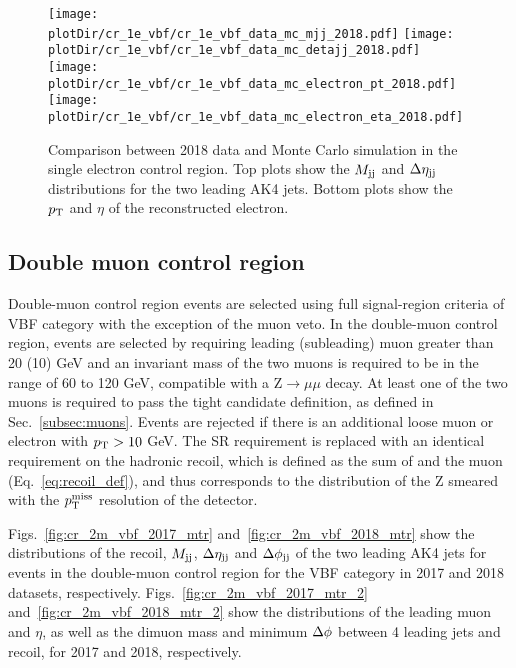 \begin{figure}[htbp]
    \begin{center}
        \texttt{[image: \\plotDir/cr\_1e\_vbf/cr\_1e\_vbf\_data\_mc\_mjj\_2018.pdf]}
        \texttt{[image: \\plotDir/cr\_1e\_vbf/cr\_1e\_vbf\_data\_mc\_detajj\_2018.pdf]} \\
        \texttt{[image: \\plotDir/cr\_1e\_vbf/cr\_1e\_vbf\_data\_mc\_electron\_pt\_2018.pdf]}
        \texttt{[image: \\plotDir/cr\_1e\_vbf/cr\_1e\_vbf\_data\_mc\_electron\_eta\_2018.pdf]}
    \end{center}
    \caption{Comparison between 2018 data and Monte Carlo simulation in the single electron control region. Top plots
    show the $M_{\textrm{jj}}$ and $\Delta \eta_{\textrm{jj}}$ distributions for the two leading AK4 jets. Bottom plots show the $p_{\textrm{T}}$ and $\eta$
    of the reconstructed electron.}
    \label{fig:cr_1e_vbf_2018_mtr}
\end{figure}

\clearpage

\subsection{Double muon control region}
\label{sec:selection_cr_2m}

Double-muon control region events are selected using full signal-region criteria of VBF category with the exception of the muon veto. 
In the double-muon control region, events are selected by requiring leading (subleading) muon \pt greater than 20 (10) GeV and 
an invariant mass of the two muons is required to be in the range of 60 to 120 GeV, compatible with a $\textrm{Z} \rightarrow \mu \mu$ decay. 
At least one of the two muons is required to 
pass the tight candidate definition, as defined in Sec.~\ref{subsec:muons}. 
Events are rejected if there is an additional loose muon or electron with $p_{\textrm{T}} > 10$ GeV. 
The SR \ptmiss requirement is replaced with an identical requirement on the hadronic recoil, 
which is defined as the sum of \ptvecmiss 
and the muon \vpt (Eq.~\ref{eq:recoil_def}), and thus corresponds to the distribution of the Z \pt smeared
with the $p_{\textrm{T}}^{\textrm{miss}}$ resolution of the detector.

Figs.~\ref{fig:cr_2m_vbf_2017_mtr} and~\ref{fig:cr_2m_vbf_2018_mtr} show the distributions of the recoil, $M_{\textrm{jj}}$, $\Delta \eta_{\textrm{jj}}$ and  
$\Delta \phi_{\textrm{jj}}$ of the two leading AK4 jets for events in the double-muon control region for the VBF category 
in 2017 and 2018 datasets, respectively. Figs.~\ref{fig:cr_2m_vbf_2017_mtr_2} and~\ref{fig:cr_2m_vbf_2018_mtr_2} show the distributions 
of the leading muon \pt and $\eta$, as well as the dimuon mass and minimum $\Delta \phi$ between 4 leading jets and recoil, for 2017 and 2018, respectively.


